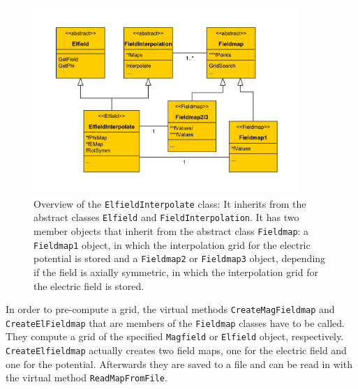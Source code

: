       \begin{figure}[h]
		\centering \includegraphics[width=0.9\textwidth]{images/KNAXSFigures/el_interpolation_uml.pdf}
		\caption{Overview of the \texttt{ElfieldInterpolate} class: It inherits from the abstract classes \texttt{Elfield} and \texttt{FieldInterpolation}. It has two member objects that inherit from the abstract class \texttt{Fieldmap}: a \texttt{Fieldmap1} object, in which the interpolation grid for the electric potential is stored and a \texttt{Fieldmap2} or \texttt{Fieldmap3} object, depending if the field is axially symmetric, in which the interpolation grid for the electric field is stored.}
		\label{fig:Elfieldinterpolate overview}
      \end{figure}
      In order to pre-compute a grid, the virtual methods \texttt{CreateMagFieldmap} and \texttt{CreateElFieldmap} that are members of the \texttt{Fieldmap} classes have to be called. They compute a grid of the specified \texttt{Magfield} or \texttt{Elfield} object, respectively. \texttt{CreateElfieldmap} actually creates two field maps, one for the electric field and one for the potential. Afterwards they are saved to a file and can be read in with the virtual method \texttt{ReadMapFromFile}.
